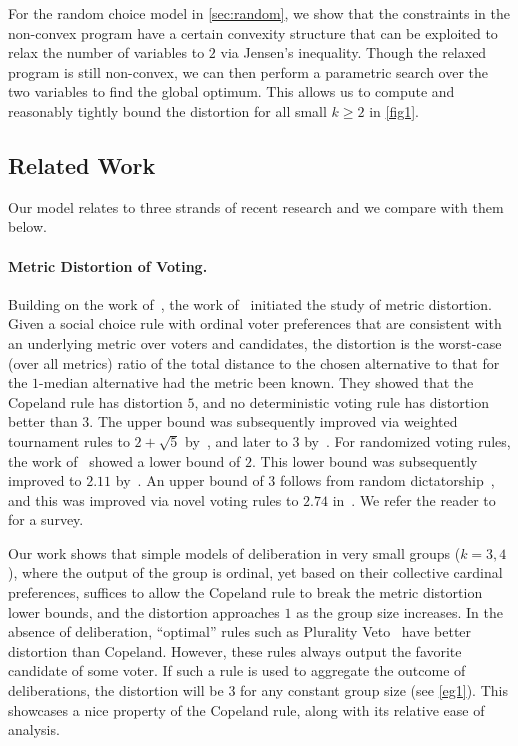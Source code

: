 For the random choice model in \cref{sec:random}, we show that the constraints in the non-convex program have a certain convexity structure that can be exploited to relax the number of variables to $2$ via Jensen's inequality. Though the relaxed program is still non-convex, we can then perform a parametric search over the two variables to find the global optimum. This allows us to compute and reasonably tightly bound the distortion for all small $k \ge 2$ in \cref{fig1}.

\subsection{Related Work}
Our model relates to three strands of recent research and we compare with them below.

\paragraph{Metric Distortion of Voting.} Building on the work of~\cite{ProcacciaR06}, the work of~\cite{AnshelevichBEPS18} initiated the study of metric distortion. Given a social choice rule with ordinal voter preferences that are consistent with an underlying metric over voters and candidates, the distortion is the worst-case (over all metrics) ratio of the total distance to the chosen alternative to that for the $1$-median alternative had the metric been known. They showed that the Copeland rule has distortion $5$, and no deterministic voting rule has distortion better than $3$.  The upper bound was subsequently improved via weighted tournament rules to $2 + \sqrt{5}$ by~\cite{MunagalaW19,Kempe_2020}, and later to $3$ by~\cite{Gkatzelis0020,Kizilkaya022}.  For randomized voting rules, the work of~\cite{AnshelevichP17} showed a lower bound of $2$. This lower bound was subsequently improved to $2.11$ by~\cite{CharikarR22}. An upper bound of $3$ follows from random dictatorship~\cite{AnshelevichP17}, and this was improved via novel voting rules to $2.74$ in~\cite{CharikarWRW24}. We refer the reader to~\cite{AnshelevichFSV21} for a survey.

Our work shows that simple models of deliberation in very small groups ($k=3,4$), where the output of the group is ordinal, yet based on their collective cardinal preferences, suffices to allow the Copeland rule to break the metric distortion lower bounds, and the distortion approaches $1$ as the group size increases. In the absence of deliberation, ``optimal'' rules such as Plurality Veto~\cite{Kizilkaya022} have better distortion than Copeland. However, these rules always output the favorite candidate of some voter. If such a rule is used to aggregate the outcome of deliberations, the distortion will be $3$ for any constant group size (see \cref{eg1}). This showcases a nice property of the Copeland rule, along with its relative ease of analysis.

